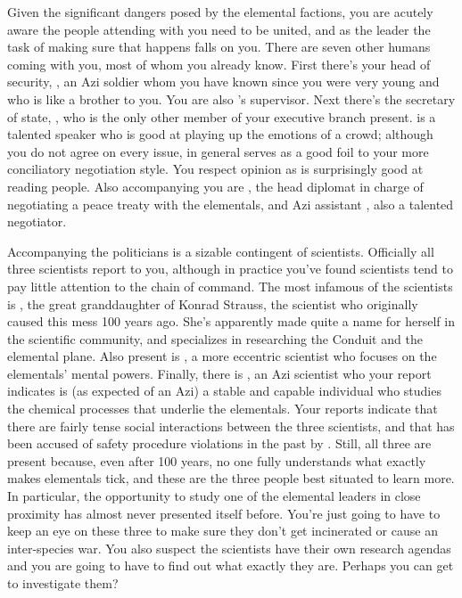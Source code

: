 \documentclass[char]{elementals}
\begin{document}
Given the significant dangers posed by the elemental factions, you are acutely aware the people attending with you need to be united, and as the leader the task of making sure that happens falls on you. There are seven other humans coming with you, most of whom you already know. First there's your head of security, \cRomeo{\intro}, an Azi soldier whom you have known since you were very young and who is like a brother to you. You are also \cRomeo{}'s supervisor. Next there's the secretary of state, \cDema{\intro}, who is the only other member of your executive branch present. \cDema{\They} is a talented speaker who is good at playing up the emotions of a crowd; although you do not agree on every issue, in general \cDema{\they} serves as a good foil to your more conciliatory negotiation style. You respect \cDema{\their} opinion as \cDema{\they} is surprisingly good at reading people. Also accompanying you are \cAvatar{\intro}, the head diplomat in charge of negotiating a peace treaty with the elementals, and \cAvatar{\their} Azi assistant \cDiplomat{\intro}, also a talented negotiator.

Accompanying the politicians is a sizable contingent of scientists. Officially all three scientists report to you, although in practice you've found scientists tend to pay little attention to the chain of command. The most infamous of the scientists is \cGD{\intro}, the great granddaughter of Konrad Strauss, the scientist who originally caused this mess 100 years ago. She's apparently made quite a name for herself in the scientific community, and specializes in researching the Conduit and the elemental plane. Also present is \cMS{\intro}, a more eccentric scientist who focuses on the elementals' mental powers. Finally, there is \cScientist{\intro}, an Azi scientist who your report indicates is (as expected of an Azi) a stable and capable individual who studies the chemical processes that underlie the elementals. Your reports indicate that there are fairly tense social interactions between the three scientists, and that \cMS{} has been accused of safety procedure violations in the past by \cScientist{}. Still, all three are present because, even after 100 years, no one fully understands what exactly makes elementals tick, and these are the three people best situated to learn more. In particular, the opportunity to study one of the elemental leaders in close proximity has almost never presented itself before. You're just going to have to keep an eye on these three to make sure they don't get incinerated or cause an inter-species war. You also suspect the scientists have their own research agendas and you are going to have to find out what exactly they are. Perhaps you can get \cBodygaurd{} to investigate them?
\end{document}
